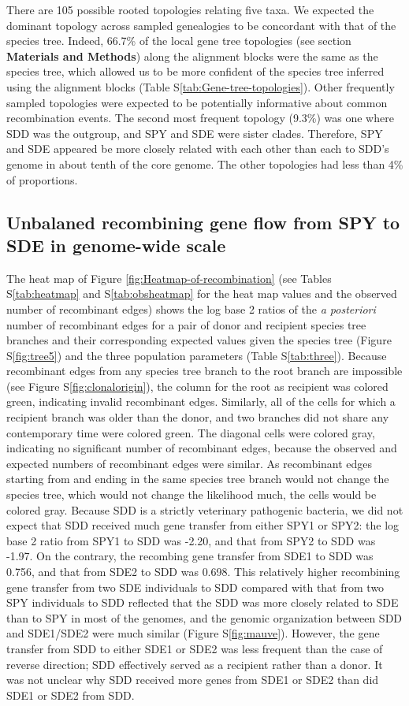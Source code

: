\documentclass[english]{article}
\begin{document}
There are 105 possible rooted topologies relating five taxa.  We expected the
dominant topology across sampled genealogies to be concordant with that of the
species tree.  Indeed, 66.7\% of the local gene tree topologies (see section
\textbf{Materials and Methods}) along the alignment blocks were the same as the
species tree, which allowed us to be more confident of the species tree inferred
using the alignment blocks (Table S\ref{tab:Gene-tree-topologies}).  Other
frequently sampled topologies were expected to be potentially informative about
common recombination events.  The second most frequent topology (9.3\%) was one
where SDD was the outgroup, and SPY and SDE were sister clades. Therefore, SPY
and SDE appeared be more closely related with each other than each to SDD's
genome in about tenth of the core genome. The other topologies had less than 4\%
of proportions.  

\subsection{Unbalaned recombining gene flow from SPY to SDE in genome-wide scale}

The heat map of Figure \ref{fig:Heatmap-of-recombination} (see Tables
S\ref{tab:heatmap} and S\ref{tab:obsheatmap} for the heat map values and the
observed number of recombinant edges) shows the log base 2 ratios of the
\textit{a posteriori} number of recombinant edges for a pair of donor and
recipient species tree branches and their corresponding expected values given
the species tree (Figure S\ref{fig:tree5}) and the three population parameters
(Table S\ref{tab:three}).  Because recombinant edges from any species tree
branch to the root branch are impossible (see Figure S\ref{fig:clonalorigin}),
the column for the root as recipient was colored green, indicating invalid
recombinant edges.  Similarly, all of the cells for which a recipient branch was
older than the donor, and two branches did not share any contemporary time were
colored green. The diagonal cells were colored gray, indicating no significant
number of recombinant edges, because the observed and expected numbers of
recombinant edges were similar. As recombinant edges starting from and ending in
the same species tree branch would not change the species tree, which would not
change the likelihood much, the cells would be colored gray.  Because SDD is a
strictly veterinary pathogenic bacteria, we did not expect that SDD received
much gene transfer from either SPY1 or SPY2: the log base 2 ratio from SPY1 to
SDD was -2.20, and that from SPY2 to SDD was -1.97.  On the contrary, the
recombing gene transfer from SDE1 to SDD was 0.756, and that from SDE2 to SDD
was 0.698. This relatively higher recombining gene transfer from two SDE
individuals to SDD compared with that from two SPY individuals to SDD reflected
that the SDD was more closely related to SDE than to SPY in most of the genomes,
and the genomic organization between SDD and SDE1/SDE2 were much similar
(Figure S\ref{fig:mauve}).  However, the gene transfer from SDD to either SDE1
or SDE2 was less frequent than the case of reverse direction; SDD effectively
served as a recipient rather than a donor. It was not unclear why SDD received
more genes from SDE1 or SDE2 than did SDE1 or SDE2 from SDD.  
\end{document}
